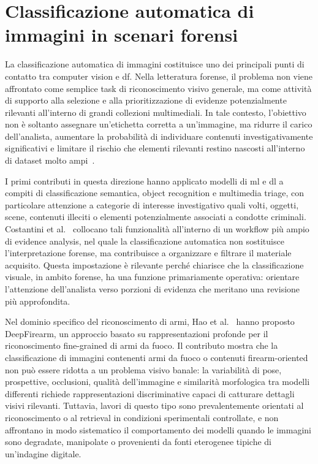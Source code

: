 \section{Classificazione automatica di immagini in scenari forensi}
\label{sec:sota-image-classification}

La classificazione automatica di immagini costituisce uno dei principali punti di contatto tra computer vision e \gls{df}. Nella letteratura forense, il problema non viene affrontato come semplice task di riconoscimento visivo generale, ma come attività di supporto alla selezione e alla prioritizzazione di evidenze potenzialmente rilevanti all'interno di grandi collezioni multimediali. In tale contesto, l'obiettivo non è soltanto assegnare un'etichetta corretta a un'immagine, ma ridurre il carico dell'analista, aumentare la probabilità di individuare contenuti investigativamente significativi e limitare il rischio che elementi rilevanti restino nascosti all'interno di dataset molto ampi~\cite{costantini2019digital,sanna2024preliminary}.

I primi contributi in questa direzione hanno applicato modelli di \gls{ml} e \gls{dl} a compiti di classificazione semantica, object recognition e multimedia triage, con particolare attenzione a categorie di interesse investigativo quali volti, oggetti, scene, contenuti illeciti o elementi potenzialmente associati a condotte criminali. Costantini et al.~\cite{costantini2019digital} collocano tali funzionalità all'interno di un workflow più ampio di evidence analysis, nel quale la classificazione automatica non sostituisce l'interpretazione forense, ma contribuisce a organizzare e filtrare il materiale acquisito. Questa impostazione è rilevante perché chiarisce che la classificazione visuale, in ambito forense, ha una funzione primariamente operativa: orientare l'attenzione dell'analista verso porzioni di evidenza che meritano una revisione più approfondita.

Nel dominio specifico del riconoscimento di armi, Hao et al.~\cite{Hao2018DeepFirearm} hanno proposto DeepFirearm, un approccio basato su rappresentazioni profonde per il riconoscimento fine-grained di armi da fuoco. Il contributo mostra che la classificazione di immagini contenenti armi da fuoco o contenuti firearm-oriented non può essere ridotta a un problema visivo banale: la variabilità di pose, prospettive, occlusioni, qualità dell'immagine e similarità morfologica tra modelli differenti richiede rappresentazioni discriminative capaci di catturare dettagli visivi rilevanti. Tuttavia, lavori di questo tipo sono prevalentemente orientati al riconoscimento o al retrieval in condizioni sperimentali controllate, e non affrontano in modo sistematico il comportamento dei modelli quando le immagini sono degradate, manipolate o provenienti da fonti eterogenee tipiche di un'indagine digitale.

